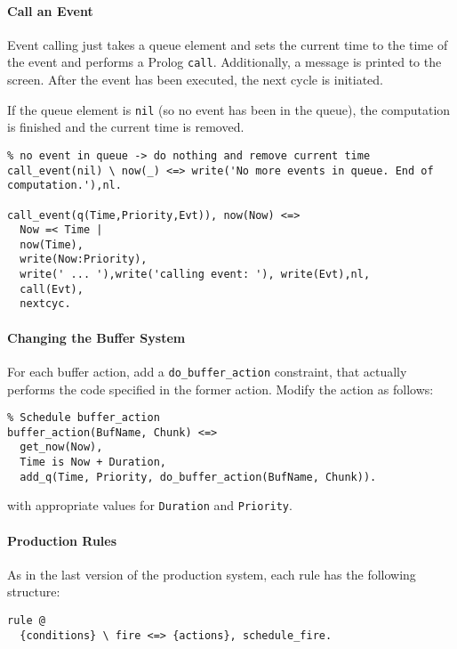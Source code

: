 \paragraph{Call an Event} 

Event calling just takes a queue element and sets the current time to the time of the event and performs a Prolog \verb|call|. Additionally, a message is printed to the screen. After the event has been executed, the next cycle is initiated.

If the queue element is \verb|nil| (so no event has been in the queue), the computation is finished and the current time is removed.

\begin{lstlisting}
% no event in queue -> do nothing and remove current time
call_event(nil) \ now(_) <=> write('No more events in queue. End of computation.'),nl.

call_event(q(Time,Priority,Evt)), now(Now) <=> 
  Now =< Time | 
  now(Time),
  write(Now:Priority),
  write(' ... '),write('calling event: '), write(Evt),nl,
  call(Evt),
  nextcyc.
\end{lstlisting}

\paragraph{Changing the Buffer System}

For each buffer action, add a \verb|do_buffer_action| constraint, that actually performs the code specified in the former action. Modify the action as follows:

\begin{lstlisting}
% Schedule buffer_action
buffer_action(BufName, Chunk) <=> 
  get_now(Now),
  Time is Now + Duration, 
  add_q(Time, Priority, do_buffer_action(BufName, Chunk)). 
\end{lstlisting}

with appropriate values for \verb|Duration| and \verb|Priority|.

\paragraph{Production Rules}

As in the last version of the production system, each rule has the following structure:

\begin{lstlisting}
rule @
  {conditions} \ fire <=> {actions}, schedule_fire.
\end{lstlisting}

